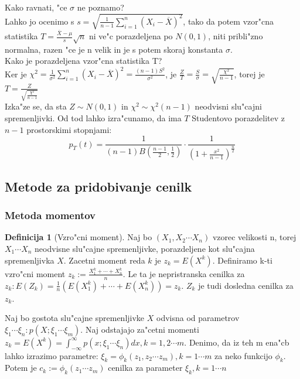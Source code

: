 \documentclass[a4paper,12pt]{article}
\theoremstyle{definition}
\newtheorem{defn}[counter]{Definicija}
\theoremstyle{remark}
\begin{document}
Kako ravnati, "ce $\sigma$ ne poznamo? \\
Lahko jo ocenimo s $s = \sqrt{\frac{1}{n-1} \sum_{i=1}^n (X_i - \overline{X})^2}$, tako da potem vzor"cna
statistika $T = \frac{\overline{X} - \mu}{s} \sqrt{n}$ ni ve"c porazdeljena po $N(0,1)$, niti pribli"zno
normalna, razen "ce je n velik in je s potem skoraj konstanta $\sigma$. \\

Kako je porazdeljena vzor"cna statistika T? \\
Ker je $\chi^2 = \frac{1}{\sigma^2} \sum_{i=1}^n (X_i - \overline{X})^2 = \frac{(n-1) S^2}{\sigma^2}$, je
$\frac{Z}{T} = \frac{S}{\sigma} = \sqrt{\frac{\chi^2}{n-1}}$, torej je $T = \frac{Z}{\sqrt{\frac{\chi^2}{n-1}}}$ \\
Izka"ze se, da sta $Z \sim N(0,1)$ in $\chi^2 \sim \chi^2(n-1)$ neodvisni slu"cajni spremenljivki. Od tod lahko
izra"cunamo, da ima $T$ Studentovo porazdelitev z $n-1$ prostorskimi stopnjami:
\begin{equation*}
    p_T(t) = \frac{1}{(n-1) B(\frac{n-1}{2}, \frac{1}{2})} \cdot \frac{1}{(1 + \frac{x^2}{n-1})^{\frac{n}{2}}}
\end{equation*}

\subsection{Metode za pridobivanje cenilk}

\subsubsection{Metoda momentov}

\begin{defn}[Vzro"cni moment]
    Naj bo $(X_1, X_2 \cdots X_n)$ vzorec velikosti n, torej $X_1 \cdots X_n$ neodvisne slu"cajne spremenljivke,
    porazdeljene kot slu"cajna spremenljivka $X$. Zacetni moment reda $k$ je $z_k = E(X^k)$. Definiramo k-ti
    vzro"cni moment $z_k := \frac{X_1^k + \cdots + X_n^k}{n}$. Le ta je nepristranska cenilka za $z_k:
    E(Z_k) = \frac{1}{n} (E(X_1^k) + \cdots + E(X_n^k)) = z_k$. $Z_k$ je tudi dosledna cenilka za $z_k$.
\end{defn}

Naj bo gostota slu"cajne spremenljivke $X$ odvisna od parametrov $\xi_1 \cdots \xi_n: p(X; \xi_1 \cdots \xi_m)$.
Naj odstajajo za"cetni momenti $z_k = E(X^k) = \int_{-\infty}^{\infty} p(x; \xi_1 \cdots \xi_n) dx, k = 1, 2 \cdots m$.
Denimo, da iz teh m ena"cb lahko izrazimo parametre: $\xi_k = \phi_k(z_1, z_2 \cdots z_m), k = 1 \cdots m$ za neko
funkcijo $\phi_k$. Potem je $c_k := \phi_k(z_1 \cdots z_m)$ cenilka za parameter $\xi_k, k = 1 \cdots n$
\end{document}
